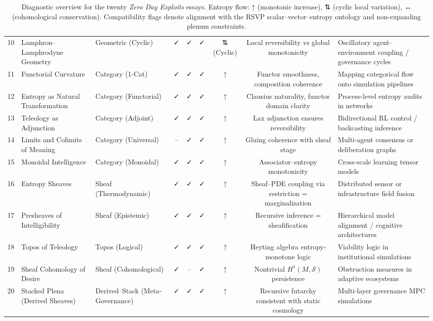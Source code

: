 \begin{table}[H]
\begin{tabular}{@{}cllcccccl@{}}
10 & Lamphron–Lamphrodyne Geometry & Geometric (Cyclic) & ✓ & ✓ & ✓ & ⇅ (Cyclic) & Local reversibility vs global monotonicity & Oscillatory agent–environment coupling / governance cycles \\
11 & Functorial Curvature & Category (1-Cat) & ✓ & ✓ & ✓ & ↑ & Functor smoothness, composition coherence & Mapping categorical flow onto simulation pipelines \\
12 & Entropy as Natural Transformation & Category (Functorial) & ✓ & ✓ & ✓ & ↑ & Clausius naturality, functor domain clarity & Process-level entropy audits in networks \\
13 & Teleology as Adjunction & Category (Adjoint) & ✓ & ✓ & ✓ & ↑ & Lax adjunction ensures reversibility & Bidirectional RL control / backcasting inference \\
14 & Limits and Colimits of Meaning & Category (Universal) & – & ✓ & ✓ & ↑ & Gluing coherence with sheaf stage & Multi-agent consensus or deliberation graphs \\
15 & Monoidal Intelligence & Category (Monoidal) & ✓ & ✓ & ✓ & ↑ & Associator–entropy monotonicity & Cross-scale learning tensor models \\
16 & Entropy Sheaves & Sheaf (Thermodynamic) & ✓ & ✓ & ✓ & ↑ & Sheaf–PDE coupling via restriction = marginalization & Distributed sensor or infrastructure field fusion \\
17 & Presheaves of Intelligibility & Sheaf (Epistemic) & ✓ & ✓ & ✓ & ↑ & Recursive inference = sheafification & Hierarchical model alignment / cognitive architectures \\
18 & Topos of Teleology & Topos (Logical) & ✓ & ✓ & ✓ & ↑ & Heyting algebra entropy-monotone logic & Viability logic in institutional simulations \\
19 & Sheaf Cohomology of Desire & Sheaf (Cohomological) & ✓ & – & ✓ & ↑ & Nontrivial $H^1(M,\mathcal{S})$ persistence & Obstruction measures in adaptive ecosystems \\
20 & Stacked Plena (Derived Sheaves) & Derived–Stack (Meta-Governance) & ✓ & ✓ & ✓ & ↑ & Recursive futarchy consistent with static cosmology & Multi-layer governance MPC simulations \\
\bottomrule
\end{tabular}
\caption{Diagnostic overview for the twenty \emph{Zero Day Exploits} essays. 
Entropy flow: ↑ (monotonic increase), ⇅ (cyclic local variation), ↔ (cohomological conservation). 
Compatibility flags denote alignment with the RSVP scalar–vector–entropy ontology and non-expanding plenum constraints.
}
\end{table}
